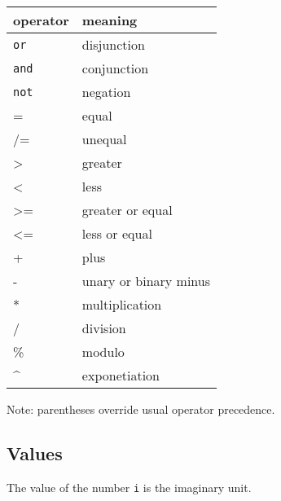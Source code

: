 \documentclass[letterpaper, 12pt]{extarticle}
\theoremstyle{definition} %
\newcommand{\code}[1]{\texttt{#1}}
\begin{document}
\begin{tabular}{l|l}
operator & meaning \\ \toprule
\code{or} & disjunction \\
\code{and} & conjunction \\
\code{not} & negation \\
= & equal \\
/= & unequal \\
\textgreater & greater \\
\textless & less \\
\textgreater= & greater or equal \\
\textless= & less or equal \\
+ & plus \\
- & unary or binary minus \\
* & multiplication \\
/ & division \\
\% & modulo \\
\^{} & exponetiation \\
\end{tabular}

Note: parentheses override usual operator precedence.

\subsection{Values}

The value of the number \code{i} is the imaginary unit.



\end{document}
